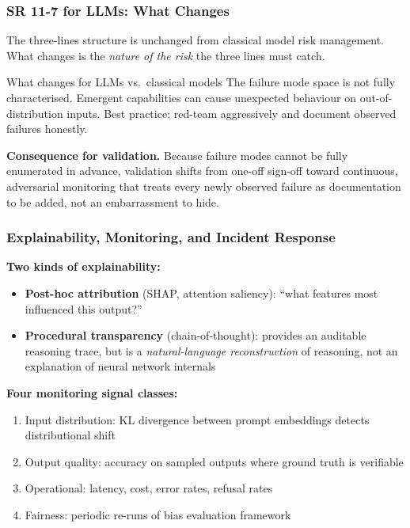\documentclass[9pt,t]{beamer}
\begin{document}
\begin{frame}
\frametitle{SR 11-7 for LLMs: What Changes}

The three-lines structure is unchanged from classical model risk management.
What changes is the \emph{nature of the risk} the three lines must catch.

\medskip
\begin{alertblock}{What changes for LLMs vs.\ classical models}
  The failure mode space is not fully characterised. Emergent capabilities can cause unexpected behaviour on out-of-distribution inputs. Best practice: red-team aggressively and document observed failures honestly.
\end{alertblock}

\medskip
\textbf{Consequence for validation.} Because failure modes cannot be fully
enumerated in advance, validation shifts from one-off sign-off toward continuous,
adversarial monitoring that treats every newly observed failure as documentation
to be added, not an embarrassment to hide.
\end{frame}

\begin{frame}
\frametitle{Explainability, Monitoring, and Incident Response}

\textbf{Two kinds of explainability:}
\begin{itemize}
  \item \textbf{Post-hoc attribution} (SHAP, attention saliency): ``what features most influenced this output?''
  \item \textbf{Procedural transparency} (chain-of-thought): provides an auditable reasoning trace, but is a \emph{natural-language reconstruction} of reasoning, not an explanation of neural network internals
\end{itemize}

\medskip
\textbf{Four monitoring signal classes:}
\begin{enumerate}
  \item Input distribution: KL divergence between prompt embeddings detects distributional shift
  \item Output quality: accuracy on sampled outputs where ground truth is verifiable
  \item Operational: latency, cost, error rates, refusal rates
  \item Fairness: periodic re-runs of bias evaluation framework
\end{enumerate}
\end{frame}
\end{document}
